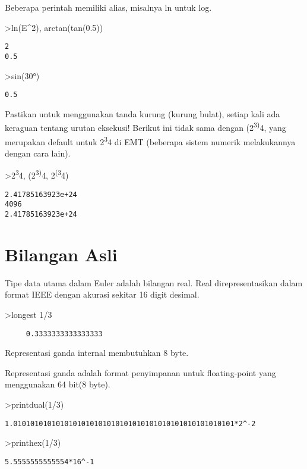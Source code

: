 \documentclass[
]{book}
\begin{document}
Beberapa perintah memiliki alias, misalnya ln untuk log.

\textgreater ln(E\^{}2), arctan(tan(0.5))

\begin{verbatim}
2
0.5
\end{verbatim}

\textgreater sin(30°)

\begin{verbatim}
0.5
\end{verbatim}

Pastikan untuk menggunakan tanda kurung (kurung bulat), setiap kali ada keraguan tentang urutan eksekusi! Berikut ini tidak sama dengan (2\textsuperscript{3)}4, yang merupakan default untuk 2\textsuperscript{3}4 di EMT (beberapa sistem numerik melakukannya dengan cara lain).

\textgreater2\textsuperscript{3}4, (2\textsuperscript{3)}4, 2\textsuperscript{(3}4)

\begin{verbatim}
2.41785163923e+24
4096
2.41785163923e+24
\end{verbatim}

\section{Bilangan Asli}\label{bilangan-asli}

Tipe data utama dalam Euler adalah bilangan real. Real direpresentasikan dalam format IEEE dengan akurasi sekitar 16 digit desimal.

\textgreater longest 1/3

\begin{verbatim}
     0.3333333333333333 
\end{verbatim}

Representasi ganda internal membutuhkan 8 byte.

Representasi ganda adalah format penyimpanan untuk floating-point yang menggunakan 64 bit(8 byte).

\textgreater printdual(1/3)

\begin{verbatim}
1.0101010101010101010101010101010101010101010101010101*2^-2
\end{verbatim}

\textgreater printhex(1/3)

\begin{verbatim}
5.5555555555554*16^-1
\end{verbatim}
\end{document}
